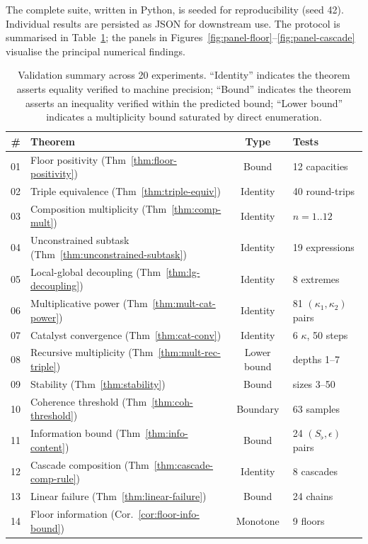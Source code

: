 \documentclass[twocolumn,11pt,a4paper]{article}
\theoremstyle{thmstyle}
\theoremstyle{thmstyle}
\theoremstyle{definition}
\theoremstyle{remark}
\begin{document}
The complete suite, written in Python, is
seeded for reproducibility (seed 42). Individual
results are persisted as JSON for downstream use.
The protocol is summarised in
Table~\ref{tab:val-summary}; the panels in
Figures~\ref{fig:panel-floor}--\ref{fig:panel-cascade}
visualise the principal numerical findings.

\begin{table}[!htbp]
\centering
\small
\caption{Validation summary across 20 experiments.
``Identity'' indicates the theorem asserts equality
verified to machine precision; ``Bound'' indicates
the theorem asserts an inequality verified within the
predicted bound; ``Lower bound'' indicates a
multiplicity bound saturated by direct enumeration.}
\label{tab:val-summary}
\begin{tabular}{rlcl}
\toprule
\# & Theorem & Type & Tests \\
\midrule
01 & Floor positivity (Thm~\ref{thm:floor-positivity}) & Bound & 12 capacities \\
02 & Triple equivalence (Thm~\ref{thm:triple-equiv}) & Identity & 40 round-trips \\
03 & Composition multiplicity (Thm~\ref{thm:comp-mult}) & Identity & $n=1..12$ \\
04 & Unconstrained subtask (Thm~\ref{thm:unconstrained-subtask}) & Identity & 19 expressions \\
05 & Local-global decoupling (Thm~\ref{thm:lg-decoupling}) & Identity & 8 extremes \\
06 & Multiplicative power (Thm~\ref{thm:mult-cat-power}) & Identity & 81 $(\kappa_1,\kappa_2)$ pairs \\
07 & Catalyst convergence (Thm~\ref{thm:cat-conv}) & Identity & 6 $\kappa$, 50 steps \\
08 & Recursive multiplicity (Thm~\ref{thm:mult-rec-triple}) & Lower bound & depths 1--7 \\
09 & Stability (Thm~\ref{thm:stability}) & Bound & sizes 3--50 \\
10 & Coherence threshold (Thm~\ref{thm:coh-threshold}) & Boundary & $63$ samples \\
11 & Information bound (Thm~\ref{thm:info-content}) & Bound & 24 $(S_\flat,\epsilon)$ pairs \\
12 & Cascade composition (Thm~\ref{thm:cascade-comp-rule}) & Identity & 8 cascades \\
13 & Linear failure (Thm~\ref{thm:linear-failure}) & Bound & 24 chains \\
14 & Floor information (Cor.~\ref{cor:floor-info-bound}) & Monotone & 9 floors \\

\end{tabular}
\end{table}
\end{document}
